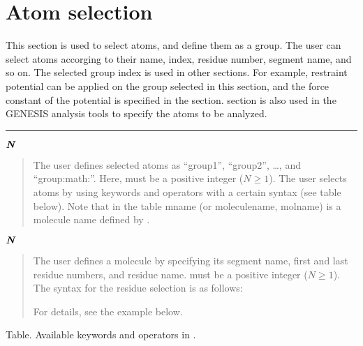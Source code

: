 \documentclass[a4paper,11pt,oneside,english]{sphinxmanual}
\begin{document}
\section{Atom selection}
\label{\detokenize{11_Selection:atom-selection}}
This section is used to select atoms, and define them as a group.
The user can select atoms accorging to their name, index, residue number, segment name, and so on.
The selected group index is used in other sections.
For example, restraint potential can be applied on the group selected in this section,
and the force constant of the potential is specified in the \sphinxstylestrong{{[}RESTRAINTS{]}} section.
\sphinxstylestrong{{[}SELECTION{]}} section is also used in the GENESIS analysis tools to specify the atoms to be analyzed.


\bigskip\hrule\bigskip


\(\textbf{\textit{N}}\) 
\begin{quote}

The user defines selected atoms as “group1”, “group2”, …, and “group:math:”.
Here,  must be a positive integer (\(N \geq 1\)).
The user selects atoms by using keywords and operators with a certain syntax (see table below).
Note that in the table mname (or moleculename, molname) is a molecule name defined by .
\end{quote}

\(\textbf{\textit{N}}\)   
\begin{quote}

The user defines a molecule by specifying its segment name, first and last residue numbers,
and residue name.  must be a positive integer (\(N \geq 1\)).
The syntax for the residue selection is as follows:


For details, see the example below.
\end{quote}

Table. Available keywords and operators in .
\end{document}
